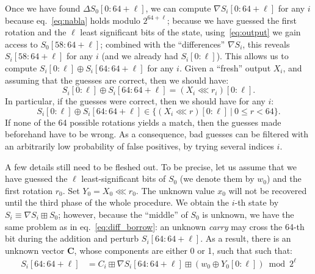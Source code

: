 \documentclass[submission,svgnames,journal=tosc]{iacrtrans}
\begin{document}
Once we have found $\Delta S_0[0:64+\ell]$, we can compute
$\nabla S_i[0:64+\ell]$ for any $i$ because eq.~\eqref{eq:nabla} holds modulo
$2^{64+\ell}$; because we have guessed the first rotation and the $\ell$ least
significant bits of the state, using~\eqref{eq:output} we gain access to
$S_0[58:64+\ell]$; combined with the ``differences'' $\nabla S_i$, this reveals
$S_i[58:64+\ell]$ for any $i$ (and we already had $S_i[0:\ell]$). This allows us
to compute $S_i[0:\ell] \oplus S_i[64:64+\ell]$ for any $i$. Given a ``fresh''
output $X_i$, and assuming that the guesses are correct, then we should have:
\begin{equation}\label{eq:find_rotation}
  S_i[0:\ell] \oplus S_i[64:64+\ell] = (X_i \lll r_i)[0:\ell].
\end{equation}
In particular, if the guesses were correct, then we should have for any $i$:
\begin{equation}\label{eq:consistency}
  S_i[0:\ell] \oplus S_i[64:64+\ell] \in \bigl\{ (X_i \lll r)[0:\ell]~|~0 \leq r < 64 \bigr\}.
\end{equation}
If none of the 64 possible rotations yields a match, then the guesses made
beforehand have to be wrong. As a consequence, bad guesses can be filtered with
an arbitrarily low probability of false positives, by trying several indices
$i$.

A few details still need to be fleshed out. To be precise, let us assume that we
have guessed the $\ell$ least-significant bits of $S_0$ (we denote them by
$w_0$) and the first rotation $r_0$. Set $Y_0 = X_0 \lll r_0$. %
The unknown value $x_0$ will not be recovered until the third phase of the whole
procedure. We obtain the $i$-th state by $S_i \equiv \nabla S_i \boxplus S_0$;
however, because the ``middle'' of $S_0$ is unknown, we have the same problem as
in eq.~\eqref{eq:diff_borrow}: an unknown \emph{carry} may cross the 64-th bit
during the addition and perturb $S_i[64:64+\ell]$. As a result, there is an
unknown vector $\mathbf{C}$, whose components are either 0 or 1, such that such
that:
\begin{align*}
  S_i[64:64+\ell] &= C_i \boxplus \nabla S_i[64:64+\ell] \boxplus (w_0 \oplus Y_0[0:\ell]) \bmod 2^\ell \\
\end{align*}
\end{document}

